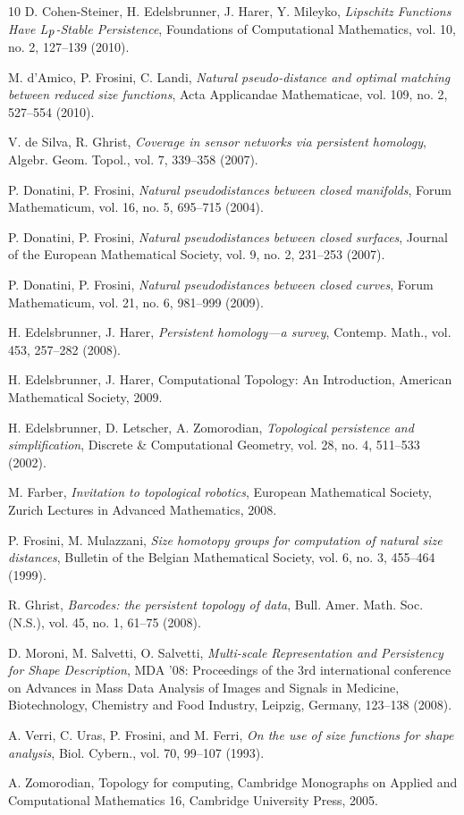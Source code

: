 \documentclass{amsart}
\theoremstyle{definition}
\theoremstyle{remark}
\numberwithin{equation}{section}
\begin{document}
\begin{thebibliography}{10}
D. Cohen-Steiner, H. Edelsbrunner, J. Harer, Y. Mileyko,
{\em Lipschitz Functions Have {L}$_{\mbox{{\it p}}}$-Stable Persistence}, Foundations of Computational Mathematics,
vol. 10, no. 2, 127--139 (2010).

 M. d'Amico, P. Frosini, C. Landi,  {\it Natural pseudo-distance and optimal matching between reduced size functions},
Acta Applicandae Mathematicae, vol. 109, no. 2, 527--554 (2010).

 V. de Silva, R. Ghrist,  {\it Coverage in sensor networks via persistent homology},
Algebr. Geom. Topol., vol. 7, 339--358 (2007).

P. Donatini, P. Frosini,
{\em Natural pseudodistances between closed manifolds},
Forum Mathematicum, vol. 16, no. 5, 695--715 (2004).

P. Donatini, P. Frosini,
{\em Natural pseudodistances between closed surfaces},
Journal of the European Mathematical Society, vol. 9, no. 2, 231--253 (2007).

P. Donatini, P. Frosini,
{\em Natural pseudodistances between closed curves},
Forum Mathematicum, vol. 21, no. 6, 981--999 (2009).

H. Edelsbrunner, J. Harer,
{\em Persistent homology---a survey},
Contemp. Math., vol. 453, 257--282 (2008).

H. Edelsbrunner, J. Harer, {Computational Topology: An Introduction}, American Mathematical Society, 2009.

H. Edelsbrunner, D. Letscher, A. Zomorodian,
{\em Topological persistence and simplification},
Discrete \& Computational Geometry, vol. 28, no. 4, 511--533 (2002).

M. Farber,
{\em Invitation to topological robotics},
European Mathematical Society, Zurich Lectures in Advanced Mathematics, 2008.

P. Frosini, M. Mulazzani,
{\em Size homotopy groups for computation of natural size distances},
 Bulletin of the Belgian Mathematical Society, vol. 6, no. 3, 455--464 (1999).

R. Ghrist,
{\em Barcodes: the persistent topology of data},
Bull. Amer. Math. Soc. (N.S.), vol. 45, no. 1, 61--75 (2008).

D. Moroni, M. Salvetti, O. Salvetti,
{\em Multi-scale Representation and Persistency for Shape Description},
MDA '08: Proceedings of the 3rd international conference on Advances
in Mass Data Analysis of Images and Signals in Medicine, Biotechnology, Chemistry and Food Industry, Leipzig, Germany, 123--138 (2008).

A. Verri, C. Uras, P. Frosini, and M. Ferri, {\it On the use of size functions for shape
analysis}, Biol. Cybern., vol. 70, 99--107 (1993).

A. Zomorodian,
Topology for computing,
Cambridge Monographs on Applied and Computational Mathematics 16, Cambridge University Press,  2005.


\end{thebibliography}
\end{document}
